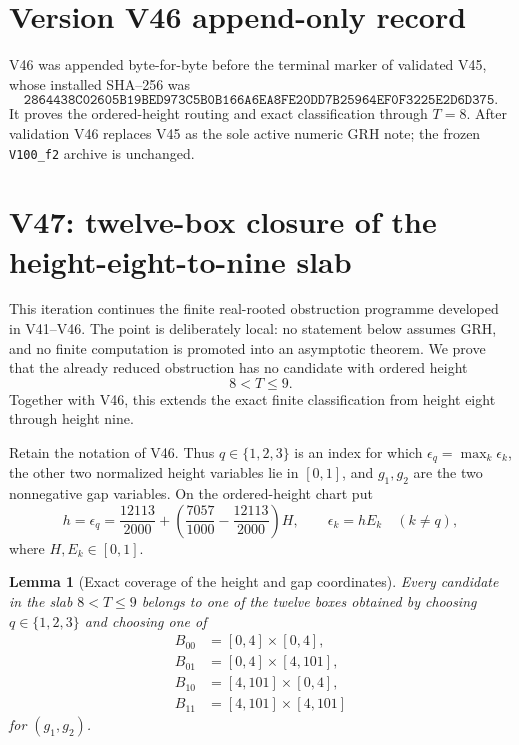 \documentclass[11pt]{article}
\newtheorem{lemma}[theorem]{Lemma}
\theoremstyle{definition}
\theoremstyle{remark}
\begin{document}
\section*{Version V46 append-only record}

V46 was appended byte-for-byte before the terminal marker of validated
V45, whose installed SHA--256 was
\[
 \texttt{2864438C02605B19BED973C5B0B166A}
 \allowbreak\texttt{6EA8FE20DD7B25964EF0F3225E2D6D375}.
\tag{N46.10}
\]
It proves the ordered-height routing and exact classification through
\(T=8\).  After validation V46 replaces V45 as the sole active numeric
GRH note; the frozen \texttt{V100\_f2} archive is unchanged.



\clearpage
\section{V47: twelve-box closure of the height-eight-to-nine slab}
\label{sec:f2v47-eight-nine}
\begingroup
\setcounter{equation}{0}
\renewcommand{\theequation}{N47.\arabic{equation}}
\renewcommand{\theHequation}{f2v47.\arabic{equation}}

This iteration continues the finite real-rooted obstruction programme developed in
V41--V46.  The point is deliberately local: no statement below assumes GRH, and
no finite computation is promoted into an asymptotic theorem.  We prove that the
already reduced obstruction has no candidate with ordered height
\[
   8<T\leq 9.
\]
Together with V46, this extends the exact finite classification from height eight
through height nine.

Retain the notation of V46.  Thus \(q\in\{1,2,3\}\) is an index for which
\(\epsilon_q=\max_k\epsilon_k\), the other two normalized height variables lie
in \([0,1]\), and \(g_1,g_2\) are the two nonnegative gap variables.  On the
ordered-height chart put
\begin{equation}
  h=\epsilon_q=\frac{12113}{2000}
       +\left(\frac{7057}{1000}-\frac{12113}{2000}\right)H,
  \qquad
  \epsilon_k=hE_k\quad(k\ne q),
  \label{eq:f2v47-height-map}
\end{equation}
where \(H,E_k\in[0,1]\).

\begin{lemma}[Exact coverage of the height and gap coordinates]
\label{lem:f2v47-cover}
Every candidate in the slab \(8<T\leq9\) belongs to one of the twelve boxes
obtained by choosing \(q\in\{1,2,3\}\) and choosing one of
\begin{equation}
 \begin{split}
 B_{00}&=[0,4]\times[0,4],\\
 B_{01}&=[0,4]\times[4,101],\\
 B_{10}&=[4,101]\times[0,4],\\
 B_{11}&=[4,101]\times[4,101]
 \end{split}
 \label{eq:f2v47-gap-boxes}
\end{equation}
for \((g_1,g_2)\).
\end{lemma}
\end{document}
